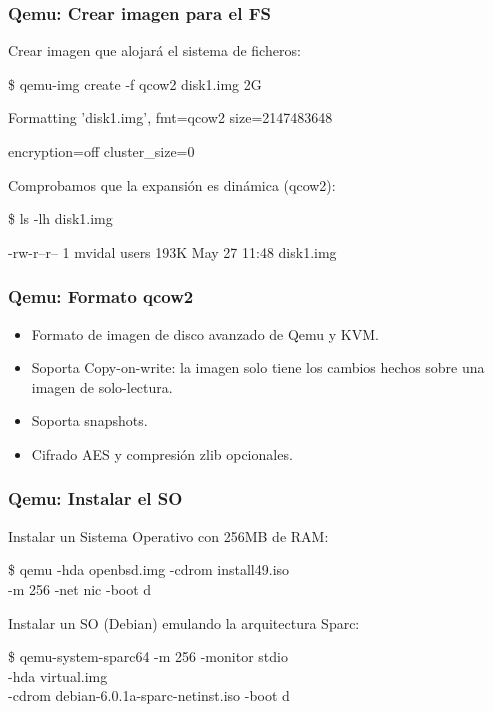 \documentclass{beamer}
\begin{document}

\begin{frame}
\frametitle{Qemu: Crear imagen para el FS}

\small
Crear imagen que alojará el sistema de ficheros:
\begin{semiverbatim}
\alert{\$ qemu-img create -f qcow2 disk1.img 2G}

Formatting 'disk1.img', fmt=qcow2 size=2147483648 

encryption=off cluster\_size=0 
\end{semiverbatim}

\medskip
Comprobamos que la expansión es dinámica (qcow2):
\begin{semiverbatim}
\alert{\$ ls -lh disk1.img} 
 
-rw-r--r--  1 mvidal  users   193K May 27 11:48 disk1.img
\end{semiverbatim}

\end{frame}


\begin{frame}[fragile]
\frametitle{Qemu: Formato qcow2}

\begin{itemize}
\item Formato de imagen de disco avanzado de Qemu y KVM. 
\item Soporta Copy-on-write: la imagen solo tiene los cambios hechos sobre una imagen de solo-lectura. 
\item Soporta snapshots.
\item Cifrado AES y compresión zlib opcionales.
\end{itemize}

\end{frame}



\begin{frame}
\frametitle{Qemu: Instalar el SO}

Instalar un Sistema Operativo con 256MB de RAM:
\begin{semiverbatim}
\$ qemu -hda openbsd.img -cdrom install49.iso \\ 

\hspace{4mm} -m 256 -net nic -boot d
\end{semiverbatim}

Instalar un SO (Debian) emulando la arquitectura Sparc:

\begin{semiverbatim}
\$ qemu-system-sparc64 -m 256 -monitor stdio \\ 

\hspace{4mm} -hda virtual.img \\

\hspace{4mm} -cdrom debian-6.0.1a-sparc-netinst.iso -boot d
\end{semiverbatim}
\end{frame}
\end{document}
